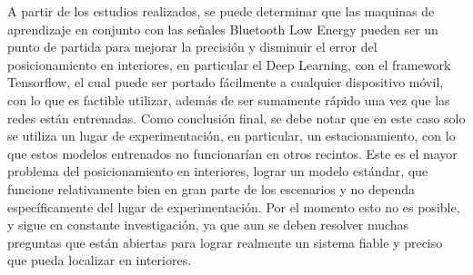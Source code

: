 A partir de los estudios realizados, se puede determinar que las maquinas de aprendizaje en conjunto con las señales Bluetooth Low Energy pueden ser un punto de partida para mejorar la precisión y disminuir el error del posicionamiento en interiores, en particular el Deep Learning, con el framework Tensorflow, el cual puede ser portado fácilmente a cualquier dispositivo móvil, con lo que es factible utilizar, además de ser sumamente rápido una vez que las redes están entrenadas. Como conclusión final, se debe notar que en este caso solo se utiliza un lugar de experimentación, en particular, un estacionamiento, con lo que estos modelos entrenados no funcionarían en otros recintos. Este es el mayor problema del posicionamiento en interiores, lograr un modelo estándar, que funcione relativamente bien en gran parte de los escenarios y no dependa específicamente del lugar de experimentación. Por el momento esto no es posible, y sigue en constante investigación, ya que aun se deben resolver muchas preguntas que están abiertas para lograr realmente un sistema fiable y preciso que pueda localizar en interiores.